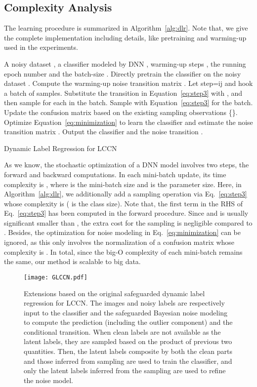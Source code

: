 \documentclass[journal]{IEEEtran}
\begin{document}
\subsection{Complexity Analysis}
The learning procedure is summarized in Algorithm~\ref{alg:dlr}. Note that, we give the complete implementation including details, like pretraining and warming-up used in the experiments.

\begin{algorithm}[t]
  \begin{algorithmic}[1]
  \REQUIRE A noisy dataset , a classifier  modeled by DNN , warming-up steps , the running epoch number  and the batch-size .
  \STATE Directly pretrain the classifier  on the noisy dataset .
  \STATE Compute the warming-up noise transition matrix .
  \STATE Let step=ij and hook a batch of samples.
  \STATE Substitute the transition in Equation~\eqref{eq:step3} with , and then sample  for each  in the batch.
  \ELSE
  \STATE Sample  with Equation~\eqref{eq:step3} for the batch.
  \ENDIF
  \STATE Update the confusion matrix  based on the existing sampling observations \{\}.
  \STATE Optimize Equation~\eqref{eq:minimization} to learn the classifier  and estimate the noise transition matrix .
  \ENDFOR
  \ENDFOR
  \STATE Output the classifier  and the noise transition .
  \end{algorithmic}
  \caption{Dynamic Label Regression for LCCN}
  \label{alg:dlr}
\end{algorithm}

As we know, the stochastic optimization of a DNN model involves two steps, the forward and backward computations. In each mini-batch update, its time complexity is , where  is the mini-batch size and  is the parameter size. Here, in Algorithm~\ref{alg:dlr}, we additionally add a sampling operation via Eq.~\eqref{eq:step3} whose complexity is  ( is the class size). Note that, the first term in the RHS of Eq.~\eqref{eq:step3} has been computed in the forward procedure. Since  and  is usually significant smaller than , the extra cost for the sampling is negligible compared to . Besides, the optimization for noise modeling in Eq.~\eqref{eq:minimization} can be ignored, as this only involves the normalization of a confusion matrix whose complexity is . In total, since the big-O complexity of each mini-batch remains the same, our method is scalable to big data. 

\begin{figure*}
\centering
\texttt{[image: GLCCN.pdf]}
\caption{Extensions based on the original safeguarded dynamic label regression for LCCN. The images and noisy labels are respectively input to the classifier and the safeguarded Bayesian noise modeling to compute the prediction (including the outlier component) and the conditional transition. When clean labels are not available as the latent labels, they are sampled based on the product of previous two quantities. Then, the latent labels composite by both the clean parts and those inferred from sampling are used to train the classifier, and only the latent labels inferred from the sampling are used to refine the noise model.}\label{fig:network2}
\end{figure*}
\end{document}
